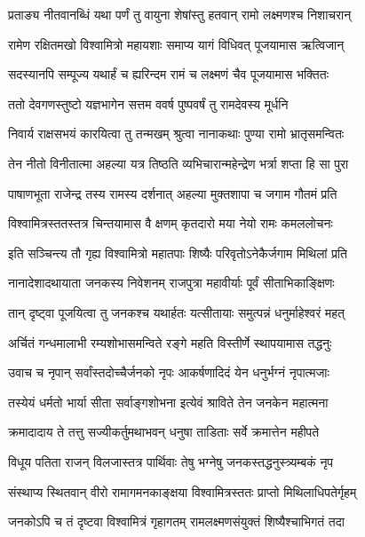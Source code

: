 \twolineshloka
{प्रताङ्य नीतवानब्धिं यथा पर्णं तु वायुना}
{शेषांस्तु हतवान् रामो लक्ष्मणश्च निशाचरान्} %

\twolineshloka
{रामेण रक्षितमखो विश्वामित्रो महायशाः}
{समाप्य यागं विधिवत् पूजयामास ऋत्विजान्} %

\twolineshloka
{सदस्यानपि सम्पूज्य यथार्हं च ह्यरिन्दम}
{रामं च लक्ष्मणं चैव पूजयामास भक्तितः} %

\twolineshloka
{ततो देवगणस्तुष्टो यज्ञभागेन सत्तम}
{ववर्ष पुष्पवर्षं तु रामदेवस्य मूर्धनि} %

\twolineshloka
{निवार्य राक्षसभयं कारयित्वा तु तन्मखम्}
{श्रुत्वा नानाकथाः पुण्या रामो भ्रातृसमन्वितः} %

\twolineshloka
{तेन नीतो विनीतात्मा अहल्या यत्र तिष्ठति}
{व्यभिचारान्महेन्द्रेण भर्त्रा शप्ता हि सा पुरा} %

\twolineshloka
{पाषाणभूता राजेन्द्र तस्य रामस्य दर्शनात्}
{अहल्या मुक्तशापा च जगाम गौतमं प्रति} %

\twolineshloka
{विश्वामित्रस्ततस्तत्र चिन्तयामास वै क्षणम्}
{कृतदारो मया नेयो रामः कमललोचनः} %

\twolineshloka
{इति सञ्चिन्त्य तौ गृह्य विश्वामित्रो महातपाः}
{शिष्यैः परिवृतोऽनेकैर्जगाम मिथिलां प्रति} %

\twolineshloka
{नानादेशादथायाता जनकस्य निवेशनम्}
{राजपुत्रा महावीर्याः पूर्वं सीताभिकाङ्क्षिणः} %

\twolineshloka
{तान् दृष्ट्वा पूजयित्वा तु जनकश्च यथार्हतः}
{यत्सीतायाः समुत्पन्नं धनुर्माहेश्वरं महत्} %

\twolineshloka
{अर्चितं गन्धमालाभी रम्यशोभासमन्विते}
{रङ्गे महति विस्तीर्णे स्थापयामास तद्धनुः} %

\twolineshloka
{उवाच च नृपान् सर्वांस्तदोच्चैर्जनको नृपः}
{आकर्षणादिदं येन धनुर्भग्नं नृपात्मजाः} %

\twolineshloka
{तस्येयं धर्मतो भार्या सीता सर्वाङ्गशोभना}
{इत्येवं श्राविते तेन जनकेन महात्मना} %

\twolineshloka
{क्रमादादाय ते तत्तु सज्यीकर्तुमथाभवन्}
{धनुषा ताडिताः सर्वे क्रमात्तेन महीपते} %

\twolineshloka
{विधूय पतिता राजन् विलजास्तत्र पार्थिवाः}
{तेषु भग्नेषु जनकस्तद्धनुस्त्र्यम्बकं नृप} %

\twolineshloka
{संस्थाप्य स्थितवान् वीरो रामागमनकाङ्क्षया}
{विश्वामित्रस्ततः प्राप्तो मिथिलाधिपतेर्गृहम्} %

\twolineshloka
{जनकोऽपि च तं दृष्टवा विश्वामित्रं गृहागतम्}
{रामलक्ष्मणसंयुक्तं शिष्यैश्चाभिगतं तदा} %


